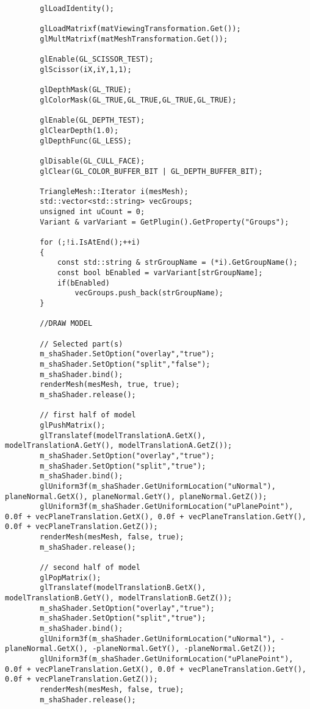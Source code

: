 \begin{verbatim}
		glLoadIdentity();

		glLoadMatrixf(matViewingTransformation.Get());
		glMultMatrixf(matMeshTransformation.Get());

		glEnable(GL_SCISSOR_TEST);
		glScissor(iX,iY,1,1);

		glDepthMask(GL_TRUE);
		glColorMask(GL_TRUE,GL_TRUE,GL_TRUE,GL_TRUE);

		glEnable(GL_DEPTH_TEST);
		glClearDepth(1.0);
		glDepthFunc(GL_LESS);

		glDisable(GL_CULL_FACE);
		glClear(GL_COLOR_BUFFER_BIT | GL_DEPTH_BUFFER_BIT);

		TriangleMesh::Iterator i(mesMesh);
		std::vector<std::string> vecGroups;
		unsigned int uCount = 0;
		Variant & varVariant = GetPlugin().GetProperty("Groups");

		for (;!i.IsAtEnd();++i)
		{
			const std::string & strGroupName = (*i).GetGroupName();
			const bool bEnabled = varVariant[strGroupName];
			if(bEnabled)
				vecGroups.push_back(strGroupName);
		}

		//DRAW MODEL

		// Selected part(s)
		m_shaShader.SetOption("overlay","true");
		m_shaShader.SetOption("split","false");
		m_shaShader.bind();
		renderMesh(mesMesh, true, true);
		m_shaShader.release();

		// first half of model
		glPushMatrix();
		glTranslatef(modelTranslationA.GetX(), modelTranslationA.GetY(), modelTranslationA.GetZ());
		m_shaShader.SetOption("overlay","true");
		m_shaShader.SetOption("split","true");
		m_shaShader.bind();
		glUniform3f(m_shaShader.GetUniformLocation("uNormal"), planeNormal.GetX(), planeNormal.GetY(), planeNormal.GetZ());
		glUniform3f(m_shaShader.GetUniformLocation("uPlanePoint"), 0.0f + vecPlaneTranslation.GetX(), 0.0f + vecPlaneTranslation.GetY(), 0.0f + vecPlaneTranslation.GetZ());
		renderMesh(mesMesh, false, true);
		m_shaShader.release();

		// second half of model
		glPopMatrix();
		glTranslatef(modelTranslationB.GetX(), modelTranslationB.GetY(), modelTranslationB.GetZ());
		m_shaShader.SetOption("overlay","true");
		m_shaShader.SetOption("split","true");
		m_shaShader.bind();
		glUniform3f(m_shaShader.GetUniformLocation("uNormal"), -planeNormal.GetX(), -planeNormal.GetY(), -planeNormal.GetZ());
		glUniform3f(m_shaShader.GetUniformLocation("uPlanePoint"), 0.0f + vecPlaneTranslation.GetX(), 0.0f + vecPlaneTranslation.GetY(), 0.0f + vecPlaneTranslation.GetZ());
		renderMesh(mesMesh, false, true);
		m_shaShader.release();


\end{verbatim}
